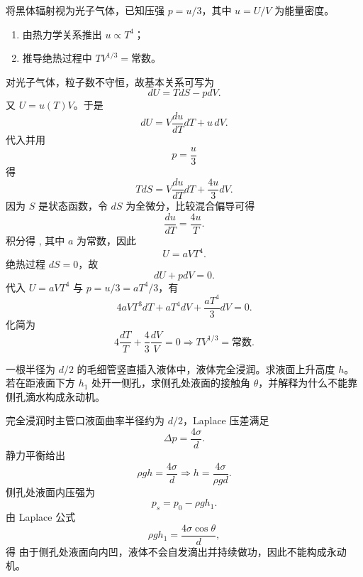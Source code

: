 \begin{question}
将黑体辐射视为光子气体，已知压强 $p=u/3$，其中 $u=U/V$ 为能量密度。
\begin{enumerate}[label=(\arabic*),leftmargin=2.8em,itemsep=0.2em]
\item 由热力学关系推出 $u\propto T^4$；
\item 推导绝热过程中 $TV^{1/3}=\text{常数}$。
\end{enumerate}
\begin{solution}

对光子气体，粒子数不守恒，故基本关系可写为
\[
 dU=T dS-p dV.
\]
又 $U=u(T)V$。于是
\[
 dU=V\frac{du}{dT}dT+u\,dV.
\]
代入并用
\[
 p=\frac{u}{3}
\]
得
\[
T dS=V\frac{du}{dT}dT+\frac{4u}{3}dV.
\]
因为 $S$ 是状态函数，令 $dS$ 为全微分，比较混合偏导可得
\[
\frac{d u}{dT}=\frac{4u}{T}.
\]
积分得
,
其中 $a$ 为常数，因此
\[
U=aVT^4.
\]
绝热过程 $dS=0$，故
\[
 dU+p dV=0.
\]
代入 $U=aVT^4$ 与 $p=u/3=aT^4/3$，有
\[
4aVT^3dT+aT^4dV+\frac{aT^4}{3}dV=0.
\]
化简为
\[
4\frac{dT}{T}+\frac{4}{3}\frac{dV}{V}=0
\Longrightarrow
\boxed{TV^{1/3}=\text{常数}.}
\]
\end{solution}
\end{question}

\begin{question}
一根半径为 $d/2$ 的毛细管竖直插入液体中，液体完全浸润。求液面上升高度 $h$。若在距液面下方 $h_1$ 处开一侧孔，求侧孔处液面的接触角 $\theta$，并解释为什么不能靠侧孔滴水构成永动机。
\begin{solution}

完全浸润时主管口液面曲率半径约为 $d/2$，Laplace 压差满足
\[
\Delta p=\frac{4\sigma}{d}.
\]
静力平衡给出
\[
\rho gh=\frac{4\sigma}{d}
\Longrightarrow
\boxed{h=\frac{4\sigma}{\rho gd}.}
\]
侧孔处液面内压强为
\[
p_s=p_0-\rho gh_1.
\]
由 Laplace 公式
\[
\rho gh_1=\frac{4\sigma\cos\theta}{d},
\]
得
由于侧孔处液面向内凹，液体不会自发滴出并持续做功，因此不能构成永动机。
\end{solution}
\end{question}

